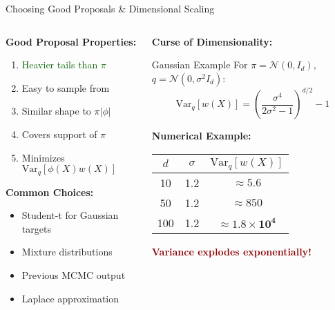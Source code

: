 \documentclass[aspectratio=169]{beamer}
\begin{document}
\begin{frame}{Choosing Good Proposals \& Dimensional Scaling}
\begin{columns}
\begin{column}{0.5\textwidth}
\textbf{Good Proposal Properties:}
\begin{enumerate}
\item \textcolor{darkgreen}{Heavier tails than $\pi$}
\item Easy to sample from
\item Similar shape to $\pi|\phi|$
\item Covers support of $\pi$
\item Minimizes $\text{Var}_q[\phi(X)w(X)]$
\end{enumerate}

\vspace{0.3cm}
\textbf{Common Choices:}
\begin{itemize}
\item Student-t for Gaussian targets
\item Mixture distributions
\item Previous MCMC output
\item Laplace approximation
\end{itemize}
\end{column}

\begin{column}{0.5\textwidth}
\textbf{Curse of Dimensionality:}
\begin{block}{Gaussian Example}
For $\pi = \mathcal{N}(0,I_d)$, $q = \mathcal{N}(0,\sigma^2 I_d)$:
$$\text{Var}_q[w(X)] = \left(\frac{\sigma^4}{2\sigma^2-1}\right)^{d/2} - 1$$
\end{block}

\textbf{Numerical Example:}
\begin{center}
\begin{tabular}{ccc}
\toprule
$d$ & $\sigma$ & $\text{Var}_q[w(X)]$ \\
\midrule
10 & 1.2 & $\approx 5.6$ \\
50 & 1.2 & $\approx 850$ \\
100 & 1.2 & $\approx \mathbf{1.8 \times 10^4}$ \\
\bottomrule
\end{tabular}
\end{center}

\textcolor{darkred}{\textbf{Variance explodes exponentially!}}
\end{column}
\end{columns}
\end{frame}
\end{document}
